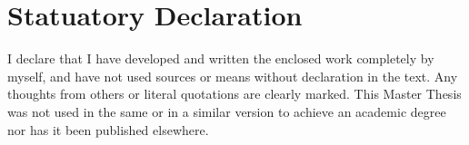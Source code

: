 \documentclass[Bachelorarbeit.tex]{subfiles}
\begin{document}
\chapter*{Statuatory Declaration}
I declare that I have developed and written the enclosed work completely by myself, and have not used sources or means without declaration in the text. Any thoughts from others or literal quotations are clearly marked. This Master Thesis was not used in the same or in a similar version to achieve an academic degree nor has it been published elsewhere.
\end{document}
